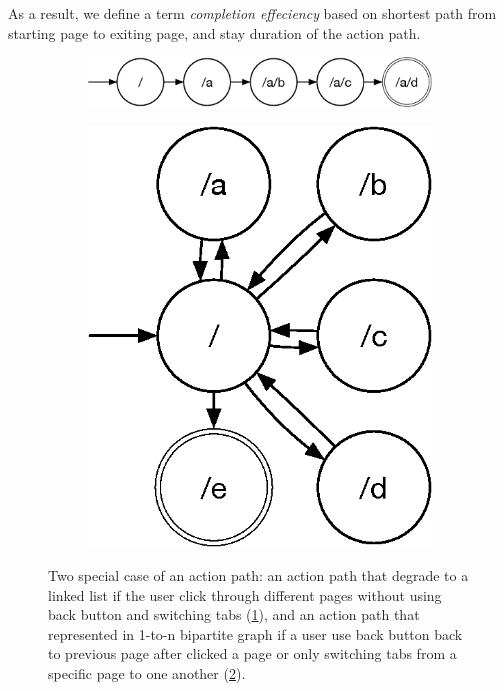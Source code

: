As a result, we define a term \emph{completion effeciency} based on shortest path from starting page
to exiting page, and stay duration of the action path. 

\begin{figure}[H]
    \centering

\begin{subfigure}[b]{0.55\textwidth}
    \includegraphics[width=1\textwidth]{figures/linked-list}
    \caption{}
    \label{fig:sim-action-1}
\end{subfigure}
    
\begin{subfigure}[b]{0.23\textwidth}
    \includegraphics[width=1\textwidth]{figures/1ton}
    \caption{}
    \label{fig:sim-action-2}
\end{subfigure}

\caption{Two special case of an action path: an action path that degrade to a linked list if the user
click through different pages without using back button and switching tabs (\ref{fig:sim-action-1}), and 
an action path that represented in 1-to-n bipartite graph if a user use back button back to previous page
after clicked a page or only switching tabs from a specific page to one another (\ref{fig:sim-action-2}).}
\label{fig:sim-action-path}
\end{figure}

